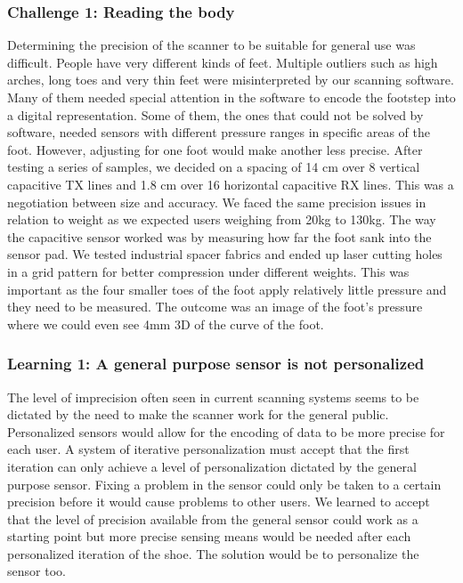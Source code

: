 \subsubsection{Challenge 1: Reading the body}

Determining the precision of the scanner to be suitable for general use was difficult. People have very different kinds of feet. Multiple outliers such as high arches, long toes and very thin feet were misinterpreted by our scanning software. Many of them needed special attention in the software to encode the footstep into a digital representation.  Some of them, the ones that could not be solved by software, needed sensors with different pressure ranges in specific areas of the foot. However, adjusting for one foot would make another less precise.  
After testing a series of samples, we decided on a spacing of 14 cm over 8 vertical capacitive TX lines and 1.8 cm over 16 horizontal capacitive RX lines. This was a negotiation between size and accuracy. We faced the same precision issues in relation to weight as we expected users weighing from 20kg to 130kg. The way the capacitive sensor worked was by measuring how far the foot sank into the sensor pad.  We tested industrial spacer fabrics and ended up laser cutting holes in a grid pattern for better compression under different weights. This was important as the four smaller toes of the foot apply relatively little pressure and they need to be measured.  The outcome was an image of the foot's pressure where we could even see 4mm 3D of the curve of the foot. 


\subsubsection{Learning 1: A general purpose sensor is not personalized}

The level of imprecision often seen in current scanning systems seems to be dictated by the need to make the scanner work for the general public. Personalized sensors would allow for the encoding of data to be more precise for each user. A system of iterative personalization must accept that the first iteration can only achieve a level of personalization dictated by the general purpose sensor. Fixing a problem in the sensor could only be taken to a certain precision before it would cause problems to other users. We learned to accept that the level of precision available from the general sensor could work as a starting point but more precise sensing means would be needed after each personalized iteration of the shoe. The solution would be to personalize the sensor too.

